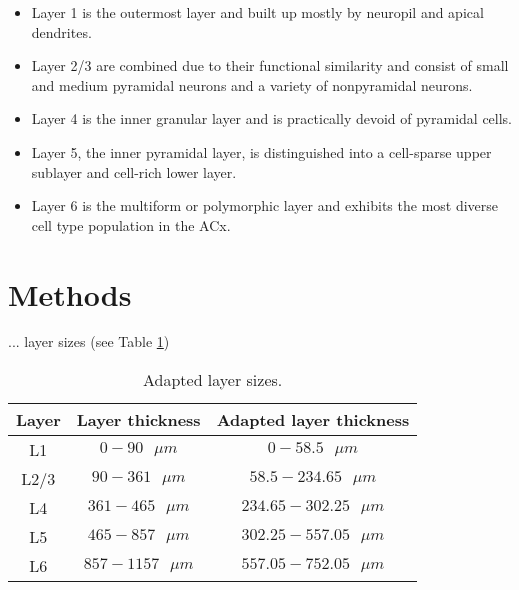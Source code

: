 \documentclass[12pt,oneside,ngerman,reqno,a4paper]{article}
\numberwithin{equation}{section}
\begin{document}
\begin{itemize}
	\item Layer 1 is the outermost layer and built up mostly by neuropil and apical dendrites.
	\item Layer 2/3 are combined due to their functional similarity and consist of small and medium pyramidal neurons and a variety of nonpyramidal neurons. 
	\item Layer 4 is the inner granular layer and is practically devoid of pyramidal cells.
	\item Layer 5, the inner pyramidal  layer, is distinguished into a cell-sparse upper sublayer and cell-rich lower layer.
	\item Layer 6 is the multiform or polymorphic layer and exhibits the most diverse cell type population in the ACx.
\end{itemize}


\newpage

\section{Methods}
... layer sizes (see Table \ref{layers})
\begin{table}[ht]
	\centering
	\caption{Adapted layer sizes.}
	\begin{tabular}{ c c c }
		\toprule
		Layer & Layer thickness \cite{Wang2020} & Adapted layer thickness \\ \hline
		L1 & \(0-90 \text{ } \mu m\) & \(0-58.5 \text{ } \mu m\) \\  
		L2/3 &\(90-361 \text{ } \mu m\) & \(58.5-234.65 \text{ } \mu m\) \\
		L4 & \(361-465 \text{ } \mu m\) &\(234.65-302.25 \text{ } \mu m\) \\
		L5 & \(465-857 \text{ } \mu m\) & \(302.25-557.05 \text{ } \mu m\) \\
		L6 & \(857-1157 \text{ } \mu m\) & \(557.05-752.05 \text{ } \mu m\)\\ \bottomrule 
	\end{tabular}
	\label{layers}
\end{table}
\end{document}

